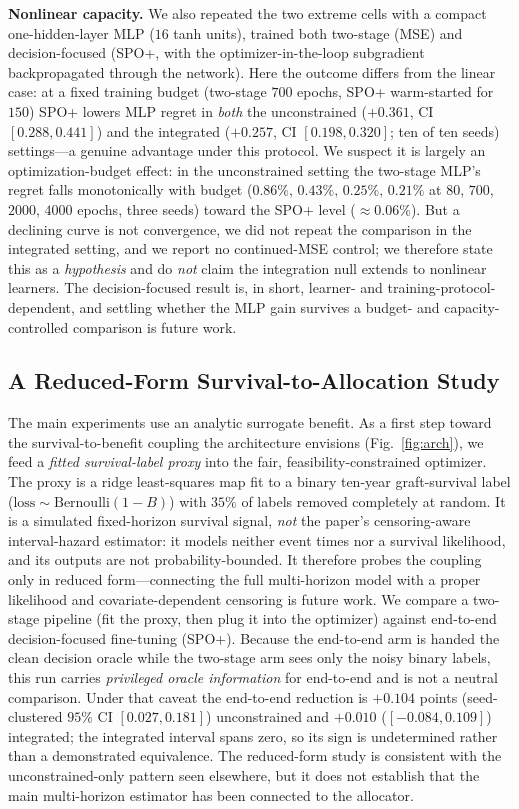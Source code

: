 \documentclass[journal]{IEEEtran}
\begin{document}
\par\textbf{Nonlinear capacity.} We also repeated the two extreme cells with a compact one-hidden-layer MLP ($16$ tanh units), trained both two-stage (MSE) and decision-focused (SPO+, with the optimizer-in-the-loop subgradient backpropagated through the network). Here the outcome differs from the linear case: at a fixed training budget (two-stage $700$ epochs, SPO+ warm-started for $150$) SPO+ lowers MLP regret in \emph{both} the unconstrained ($+0.361$, CI $[0.288,0.441]$) and the integrated ($+0.257$, CI $[0.198,0.320]$; ten of ten seeds) settings---a genuine advantage under this protocol. We suspect it is largely an optimization-budget effect: in the unconstrained setting the two-stage MLP's regret falls monotonically with budget ($0.86\%,\,0.43\%,\,0.25\%,\,0.21\%$ at $80$, $700$, $2000$, $4000$ epochs, three seeds) toward the SPO+ level ($\approx0.06\%$). But a declining curve is not convergence, we did not repeat the comparison in the integrated setting, and we report no continued-MSE control; we therefore state this as a \emph{hypothesis} and do \emph{not} claim the integration null extends to nonlinear learners. The decision-focused result is, in short, learner- and training-protocol-dependent, and settling whether the MLP gain survives a budget- and capacity-controlled comparison is future work.

\subsection{A Reduced-Form Survival-to-Allocation Study}
\label{sec:loop}
The main experiments use an analytic surrogate benefit. As a first step toward the survival-to-benefit coupling the architecture envisions (Fig.~\ref{fig:arch}), we feed a \emph{fitted survival-label proxy} into the fair, feasibility-constrained optimizer. The proxy is a ridge least-squares map fit to a binary ten-year graft-survival label ($\text{loss}\sim\text{Bernoulli}(1-B)$) with $35\%$ of labels removed completely at random. It is a simulated fixed-horizon survival signal, \emph{not} the paper's censoring-aware interval-hazard estimator: it models neither event times nor a survival likelihood, and its outputs are not probability-bounded. It therefore probes the coupling only in reduced form---connecting the full multi-horizon model with a proper likelihood and covariate-dependent censoring is future work. We compare a two-stage pipeline (fit the proxy, then plug it into the optimizer) against end-to-end decision-focused fine-tuning (SPO+). Because the end-to-end arm is handed the clean decision oracle while the two-stage arm sees only the noisy binary labels, this run carries \emph{privileged oracle information} for end-to-end and is not a neutral comparison. Under that caveat the end-to-end reduction is $+0.104$ points (seed-clustered $95\%$ CI $[0.027,0.181]$) unconstrained and $+0.010$ ($[-0.084,0.109]$) integrated; the integrated interval spans zero, so its sign is undetermined rather than a demonstrated equivalence. The reduced-form study is consistent with the unconstrained-only pattern seen elsewhere, but it does not establish that the main multi-horizon estimator has been connected to the allocator.
\end{document}
